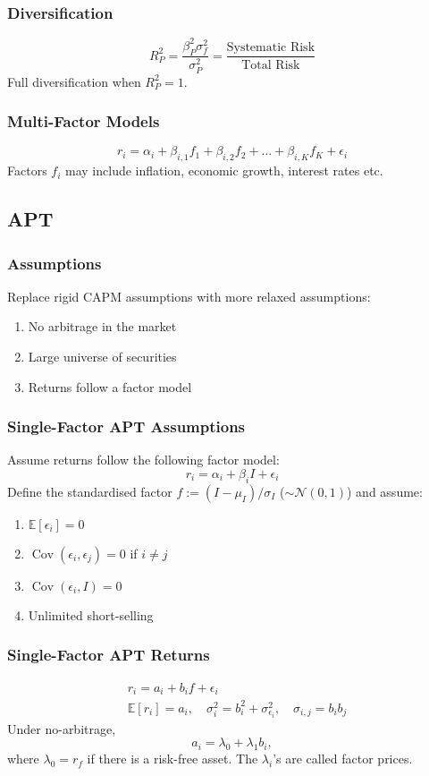 \documentclass[11pt]{article}
\newcommand{\E}{\mathbb{E}}
\newcommand{\Cov}{\operatorname{Cov}}
\begin{document}
	\subsubsection{Diversification}	
	\[	R_P^2 = \frac{\beta_P^2 \sigma_f^2}{\sigma_P^2} = \frac{\text{Systematic Risk}}{\text{Total Risk}}\]
	Full diversification when \( R_P^2 = 1 \).
	\subsubsection{Multi-Factor Models}
	\[	r_i = \alpha_i + \beta_{i, 1}f_1 + \beta_{i, 2}f_2 + ... + \beta_{i, K} f_K + \epsilon_i \]
	Factors \( f_i \) may include inflation, economic growth, interest rates etc.
	\subsection{APT}
	\subsubsection{Assumptions}
	Replace rigid CAPM assumptions with more relaxed assumptions:
	\begin{enumerate}
		\item No arbitrage in the market
		\item Large universe of securities
		\item Returns follow a factor model
	\end{enumerate}
	\subsubsection{Single-Factor APT Assumptions}
	Assume returns follow the following factor model:
		\[	r_i = \alpha_i + \beta_{i}I+\epsilon_{i}\]
	Define the standardised factor \( f:=(I - \mu_{I})/\sigma_{I} \) (\( \sim\mathcal{N}(0,1) \)) and assume:
	\begin{enumerate}
		\item \( \E[\epsilon_i] = 0 \)
		\item \( \Cov(\epsilon_i, \epsilon_j) = 0\) if \( i\neq j \)
		\item \( \Cov(\epsilon_i, I) = 0\)
		\item Unlimited short-selling
	\end{enumerate}
	\subsubsection{Single-Factor APT Returns}
	\begin{align*}
		& r_i = a_i + b_i f + \epsilon_i\\[5pt]
		& \E[r_i] = a_i,\quad \sigma_i^2 = b_i^2 + \sigma_{\epsilon_i}^2,\quad\sigma_{i, j} = b_{i}b_{j}
	\end{align*}
	Under no-arbitrage, 
	\[	a_i = \lambda_0 + \lambda_1 b_i,\]
	where \( \lambda_0 = r_f \) if there is a risk-free asset. The \( \lambda_i \)'s are called factor prices.
\end{document}

